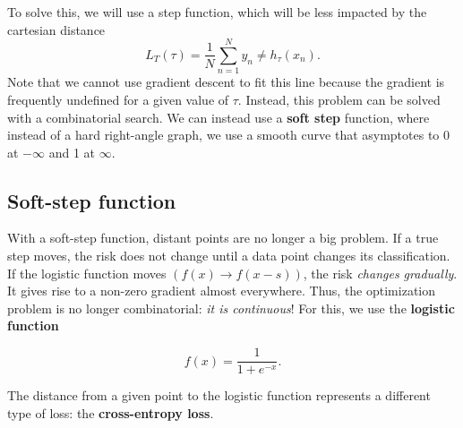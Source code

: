 \documentclass[titlepage, 12pt, leqno]{article}
\begin{document}
To solve this, we will use a step function, which will be less impacted by the
cartesian distance
\[
    L_{T}(\tau) = \frac{1}{N}\sum_{n=1}^{N}y_{n}\ne h_{\tau}(x_{n}).
\]
Note that we cannot use gradient descent to fit this line because the gradient
is frequently undefined for a given value of $\tau$. Instead, this problem can
be solved with a combinatorial search. We can instead use a \textbf{soft step}
function, where instead of a hard right-angle graph, we use a smooth curve that
asymptotes to 0 at $-\infty$ and 1 at $\infty$. 

\subsection{Soft-step function}
With a soft-step function, distant points are no longer a big problem. If a 
true step moves, the risk does not change until a data point changes its
classification. If the logistic function moves $(f(x)\rightarrow f(x-s))$, the
risk \textit{changes gradually}. It gives rise to a non-zero gradient almost
everywhere. Thus, the optimization problem is no longer combinatorial: \textit{it
is continuous}! For this, we use the \textbf{logistic function}

\[
    f(x) = \frac{1}{1+e^{-x}}.
\]

\begin{definition}
    The distance from a given point to the logistic function represents a
    different type of loss: the \textbf{cross-entropy loss}.
\end{definition}
\end{document}
